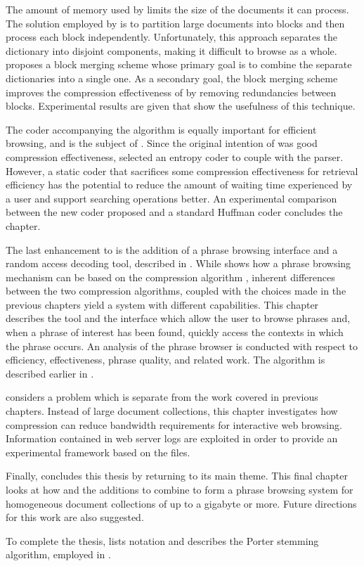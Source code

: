 The amount of memory used by \repair limits the
size of the documents it can process.  The solution employed by 
\citet{lm00:procieee} is to
partition large documents into blocks and then process each block
independently.  Unfortunately, this approach separates the 
dictionary into disjoint components, making it difficult to 
browse as a whole.   proposes
a block merging
scheme whose primary goal is to combine the separate dictionaries
into a single one.  As a secondary goal, the block
merging scheme improves the compression effectiveness of \repair
by removing redundancies between blocks.  
Experimental results are given that show the usefulness of this
technique.

The coder accompanying the \repair algorithm is equally 
important for efficient browsing, and is the subject of 
.  Since the original intention of \repair
was good compression effectiveness, 
\citet{lm00:procieee} selected an entropy coder to couple with
the parser.  However, a static coder that sacrifices
some compression effectiveness for retrieval efficiency has the
potential to reduce the amount of waiting time experienced by
a user and support searching operations better.  
An experimental comparison between the new coder proposed 
and a standard Huffman coder concludes the chapter.

The last enhancement to \repair is the addition 
of a phrase browsing interface and a random access decoding 
tool, described in .  
While \citet{nwp97:acmdl} shows how a phrase 
browsing mechanism can be based on the compression 
algorithm \sequitur \citep{nw97:cj}, inherent
differences between the two compression algorithms,
coupled with the choices made in the previous chapters 
yield a system with different capabilities.
This chapter describes the tool and the
interface which allow the user to
browse phrases and, when a phrase of interest has been found,
quickly access the contexts in which the phrase occurs.  
An analysis of the phrase browser is conducted with respect
to efficiency, effectiveness, phrase quality, and related work.
The \sequitur algorithm is described earlier in .

 considers a problem which is separate from
the work covered in previous 
chapters.  Instead of large document collections, 
this chapter investigates how
compression can reduce bandwidth requirements for interactive 
web browsing.  Information 
contained in web server logs are exploited in order to 
provide an experimental framework based on the \html files.

Finally,  concludes this thesis by returning
to its main theme.  This final chapter looks at
how \repair and the additions to \repair combine to form 
a phrase browsing system for homogeneous document collections of
up to a gigabyte or more.  Future directions for this work are
also suggested.

To complete the thesis,  lists 
notation and  describes
the Porter stemming algorithm, employed in .
